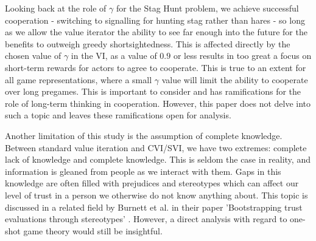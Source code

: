 Looking back at the role of $\gamma$ for the Stag Hunt problem, we achieve successful cooperation - switching to signalling for hunting stag rather than hares - so long as we allow the value iterator the ability to see far enough into the future for the benefits to outweigh greedy shortsightedness. This is affected directly by the chosen value of $\gamma$ in the VI, as a value of $0.9$ or less results in too great a focus on short-term rewards for actors to agree to cooperate. This is true to an extent for all game representations, where a small $\gamma$ value will limit the ability to cooperate over long pregames. This is important to consider and has ramifications for the role of long-term thinking in cooperation. However, this paper does not delve into such a topic and leaves these ramifications open for analysis.

Another limitation of this study is the assumption of complete knowledge. Between standard value iteration and CVI/SVI, we have two extremes: complete lack of knowledge and complete knowledge. This is seldom the case in reality, and information is gleaned from people as we interact with them. Gaps in this knowledge are often filled with prejudices and stereotypes which can affect our level of trust in a person we otherwise do not know anything about. This topic is discussed in a related field by Burnett et al. in their paper 'Bootstrapping trust evaluations through stereotypes' \cite{burnett2010bootstrapping}. However, a direct analysis with regard to one-shot game theory would still be insightful.
